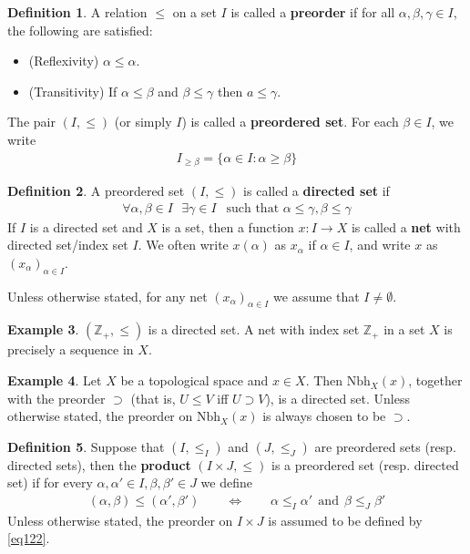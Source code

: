 \documentclass[12pt,b5paper,notitlepage]{article}
\theoremstyle{definition}
\newtheorem{df}{Definition}[subsection]
\newtheorem{eg}[df]{Example}
\theoremstyle{plain}
\newcommand{\Zbb}{\mathbb Z}
\newcommand{\Nbh}{\mathrm{Nbh}}
\newcommand{\hqed}{\hfill\qedsymbol}
\numberwithin{equation}{section}
\begin{document}
\begin{df}\label{lb352}
A relation $\leq$ on a set $I$ is called a \textbf{preorder}  if for all $\alpha,\beta,\gamma\in I$, the following are satisfied:
\begin{itemize}
\item (Reflexivity) $\alpha\leq \alpha$.
\item (Transitivity) If $\alpha\leq \beta$ and $\beta\leq \gamma$ then $a\leq \gamma$.
\end{itemize}
The pair $(I,\leq)$ (or simply $I$) is called a \textbf{preordered set}. For each $\beta\in I$, we write 
\begin{gather}\label{eq183}
I_{\geq\beta}=\{\alpha\in I:\alpha\geq\beta\}
\end{gather}
\end{df}

\begin{df}
A preordered set $(I,\leq)$ is called a \textbf{directed set}  if 
\begin{align}
\forall\alpha,\beta\in I~~~\exists\gamma\in I~~\text{ such that }\alpha\leq \gamma,\beta\leq\gamma  \label{eq123}
\end{align}
If $I$ is a directed set and $X$ is a set, then a function $x:I\rightarrow X$ is called a \textbf{net}  with directed set/index set $I$. We often write $x(\alpha)$ as $x_\alpha$ if $\alpha\in I$, and write $x$ as $(x_\alpha)_{\alpha\in I}$.

Unless otherwise stated, for any net $(x_\alpha)_{\alpha\in I}$ we assume that $I\neq\emptyset$.  \hqed
\end{df}


\begin{eg}
$(\Zbb_+,\leq)$ is a directed set. A net with index set $\Zbb_+$ in a set $X$ is precisely a sequence in $X$.
\end{eg}


\begin{eg}
Let $X$ be a topological space and $x\in X$. Then $\Nbh_X(x)$, together with the preorder $\supset$ (that is, $U\leq V$ iff $U\supset V$), is a directed set. Unless otherwise stated, the preorder on $\Nbh_X(x)$ is always chosen to be $\supset$.
\end{eg}

\begin{df}\label{lb207}
Suppose that $(I,\leq_I )$ and $(J,\leq_J)$ are preordered sets (resp. directed sets), then the \textbf{product}  $(I\times J,\leq)$ is a preordered set (resp. directed set) if for every $\alpha,\alpha'\in I,\beta,\beta'\in J$ we define
\begin{align}\label{eq122}
(\alpha,\beta)\leq (\alpha',\beta')\qquad\Longleftrightarrow\qquad \alpha\leq_I \alpha'~~\text{and}~~\beta\leq_J\beta'
\end{align}
Unless otherwise stated, the preorder on $I\times J$ is assumed to be defined by \eqref{eq122}.
\end{df}
\end{document}
